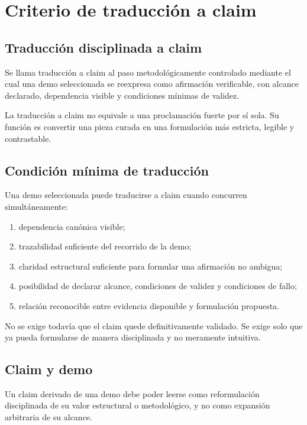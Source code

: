 \chapter{Criterio de traducción a claim}

\section{Traducción disciplinada a claim}
\begin{definition}
Se llama traducción a claim al paso metodológicamente controlado mediante el cual una demo seleccionada se reexpresa como afirmación verificable, con alcance declarado, dependencia visible y condiciones mínimas de validez.
\end{definition}

\begin{observation}
La traducción a claim no equivale a una proclamación fuerte por sí sola. Su función es convertir una pieza curada en una formulación más estricta, legible y contrastable.
\end{observation}

\section{Condición mínima de traducción}
\begin{definition}
Una demo seleccionada puede traducirse a claim cuando concurren simultáneamente:
\begin{enumerate}
  \item dependencia canónica visible;
  \item trazabilidad suficiente del recorrido de la demo;
  \item claridad estructural suficiente para formular una afirmación no ambigua;
  \item posibilidad de declarar alcance, condiciones de validez y condiciones de fallo;
  \item relación reconocible entre evidencia disponible y formulación propuesta.
\end{enumerate}
\end{definition}

\begin{observation}
No se exige todavía que el claim quede definitivamente validado. Se exige solo que ya pueda formularse de manera disciplinada y no meramente intuitiva.
\end{observation}

\section{Claim y demo}
\begin{definition}
Un claim derivado de una demo debe poder leerse como reformulación disciplinada de su valor estructural o metodológico, y no como expansión arbitraria de su alcance.
\end{definition}

